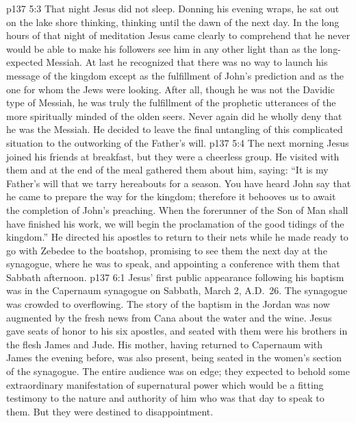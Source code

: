 \vs p137 5:3 That night Jesus did not sleep. Donning his evening wraps, he sat out on the lake shore thinking, thinking until the dawn of the next day. In the long hours of that night of meditation Jesus came clearly to comprehend that he never would be able to make his followers see him in any other light than as the long\hyp{}expected Messiah. At last he recognized that there was no way to launch his message of the kingdom except as the fulfillment of John’s prediction and as the one for whom the Jews were looking. After all, though he was not the Davidic type of Messiah, he was truly the fulfillment of the prophetic utterances of the more spiritually minded of the olden seers. Never again did he wholly deny that he was the Messiah. He decided to leave the final untangling of this complicated situation to the outworking of the Father’s will.
\vs p137 5:4 The next morning Jesus joined his friends at breakfast, but they were a cheerless group. He visited with them and at the end of the meal gathered them about him, saying: \textcolor{ubdarkred}{“It is my Father’s will that we tarry hereabouts for a season. You have heard John say that he came to prepare the way for the kingdom; therefore it behooves us to await the completion of John’s preaching. When the forerunner of the Son of Man shall have finished his work, we will begin the proclamation of the good tidings of the kingdom.”} He directed his apostles to return to their nets while he made ready to go with Zebedee to the boatshop, promising to see them the next day at the synagogue, where he was to speak, and appointing a conference with them that Sabbath afternoon.\plusone
{}
\vs p137 6:1 Jesus’ first public appearance following his baptism was in the Capernaum synagogue on Sabbath, March 2, A.D.~26. The synagogue was crowded to overflowing. The story of the baptism in the Jordan was now augmented by the fresh news from Cana about the water and the wine. Jesus gave seats of honor to his six apostles, and seated with them were his brothers in the flesh James and Jude. His mother, having returned to Capernaum with James the evening before, was also present, being seated in the women’s section of the synagogue. The entire audience was on edge; they expected to behold some extraordinary manifestation of supernatural power which would be a fitting testimony to the nature and authority of him who was that day to speak to them. But they were destined to disappointment.
